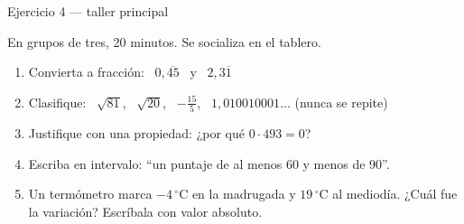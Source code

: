 \documentclass[aspectratio=169,10pt]{beamer}
\begin{document}
\begin{frame}{Ejercicio 4 — taller principal}
  \begin{alertblock}{En grupos de tres, 20 minutos. Se socializa en el tablero.}
    \scriptsize
    \begin{enumerate}\setlength{\itemsep}{0.02cm}
      \item Convierta a fracción: \ $0{,}\overline{45}$ \ y \ $2{,}3\overline{1}$
      \item Clasifique: \ $\sqrt{81}$, \ $\sqrt{20}$, \ $-\tfrac{15}{5}$, \
            $1{,}010010001\dots$ (nunca se repite)
      \item Justifique con una propiedad: ¿por qué $0\cdot 493 = 0$?
      \item Escriba en intervalo: ``un puntaje de al menos 60 y menos de 90''.
      \item Un termómetro marca $-4\,^{\circ}$C en la madrugada y
            $19\,^{\circ}$C al mediodía. ¿Cuál fue la variación? Escríbala con
            valor absoluto.
    \end{enumerate}
  \end{alertblock}
\end{frame}
\end{document}
